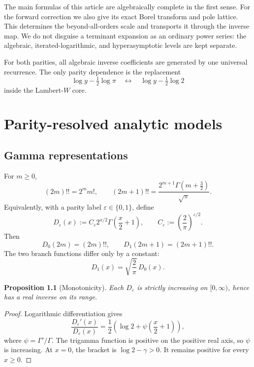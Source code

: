 \documentclass[11pt,a4paper,oneside]{book}
\newtheorem{proposition}[theorem]{Proposition}
\newcommand{\eps}{\varepsilon}
\begin{document}
The main formulas of this article are algebraically complete in the first sense.
For the forward correction we also give its exact Borel transform and pole
lattice.  This determines the beyond-all-orders scale and transports it through
the inverse map.  We do not disguise a terminant expansion as an ordinary
power series: the algebraic, iterated-logarithmic, and hyperasymptotic levels are
kept separate.

\begin{resultbox}
For both parities, all algebraic inverse coefficients are generated by one
universal recurrence.  The only parity dependence is the replacement
\[
 \log y-\tfrac12\log\pi
 \quad\longleftrightarrow\quad
 \log y-\tfrac12\log2
\]
inside the Lambert-\(W\) core.
\end{resultbox}

\chapter{Parity-resolved analytic models}

\section{Gamma representations}

For \(m\ge0\),
\[
 (2m)!!=2^m m!,
 \qquad
 (2m+1)!!=\frac{2^{m+1}\Gamma(m+\tfrac32)}{\sqrt\pi}.
\]
Equivalently, with a parity label \(\eps\in\{0,1\}\), define
\begin{equation}\label{eq:D-eps}
 D_\eps(x)
 :=C_\eps 2^{x/2}\Gamma\!\left(\frac{x}{2}+1\right),
 \qquad
 C_\eps:=\left(\frac{2}{\pi}\right)^{\eps/2}.
\end{equation}
Then
\[
 D_0(2m)=(2m)!!,
 \qquad
 D_1(2m+1)=(2m+1)!!.
\]
The two branch functions differ only by a constant:
\[
 D_1(x)=\sqrt{\frac{2}{\pi}}\,D_0(x).
\]

\begin{proposition}[Monotonicity]\label{prop:monotone}
Each \(D_\eps\) is strictly increasing on \([0,\infty)\), hence has a real
inverse on its range.
\end{proposition}

\begin{proof}
Logarithmic differentiation gives
\[
 \frac{D_\eps'(x)}{D_\eps(x)}
 =\frac12\left(
   \log2+\psi\!\left(\frac{x}{2}+1\right)
 \right),
\]
where \(\psi=\Gamma'/\Gamma\).  The trigamma function is positive on the
positive real axis, so \(\psi\) is increasing.  At \(x=0\), the bracket is
\(\log2-\gamma>0\).  It remains positive for every \(x\ge0\).
\end{proof}
\end{document}
